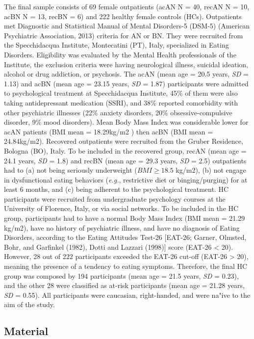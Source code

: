 \documentclass[
  man,floatsintext]{apa6}
\begin{document}
The final sample consists of 69 female outpatients (acAN N = 40, recAN N = 10, acBN N = 13, recBN = 6) and 222 healthy female controls (HCs). Outpatients met Diagnostic and Statistical Manual of Mental Disorders-5 (DSM-5) (American Psychiatric Association, 2013) criteria for AN or BN. They were recruited from the Specchidacqua Institute, Montecatini (PT), Italy, specialized in Eating Disorders. Eligibility was evaluated by the Mental Health professionals of the Institute, the exclusion criteria were having neurological illness, suicidal ideation, alcohol or drug addiction, or psychosis. The acAN (mean age = 20.5 years, \emph{SD} = 1.13) and acBN (mean age = 23.15 years, \emph{SD} = 1.87) participants were admitted to psychological treatment at Specchidacqua Institute, 45\% of them were also taking antidepressant medication (SSRI), and 38\% reported comorbidity with other psychiatric illnesses (22\% anxiety disorders, 20\% obsessive-compulsive disorder, 9\% mood disorders). Mean Body Mass Index was considerable lower for acAN patients (BMI mean = 18.29kg/m2 ) then acBN (BMI mean = 24.84kg/m2). Recovered outpatients were recruited from the Gruber Residence, Bologna (BO), Italy. To be included in the recovered group, recAN (mean age = 24.1 years, \emph{SD} = 1.8) and recBN (mean age = 29.3 years, \emph{SD} = 2.5) outpatients had to (a) not being seriously underweight (\(BMI \ge 18.5\) kg/m2), (b) not engage in dysfunctional eating behaviors (\emph{e.g.}, restrictive diet or binging/purging) for at least 6 months, and (c) being adherent to the psychological treatment. HC participants were recruited from undergraduate psychology courses at the University of Florence, Italy, or via social networks. To be included in the HC group, participants had to have a normal Body Mass Index (BMI mean = 21.29 kg/m2), have no history of psychiatric illness, and have no diagnosis of Eating Disorders, according to the Eating Attitudes Test-26 {[}EAT-26; Garner, Olmsted, Bohr, and Garfinkel (1982), Dotti and Lazzari (1998){]} score (EAT-26 \textless{} 20). However, 28 out of 222 participants exceeded the EAT-26 cut-off (EAT-26 \textgreater{} 20), meaning the presence of a tendency to eating symptoms. Therefore, the final HC group was composed by 194 participants (mean age = 21.5 years, \emph{SD} = 0.23), and the other 28 were classified as at-risk participants (mean age = 21.28 years, \emph{SD} = 0.55).
All participants were caucasian, right-handed, and were na"ive to the aim of the study.

\hypertarget{material}{%
\subsection{Material}\label{material}}
\end{document}

